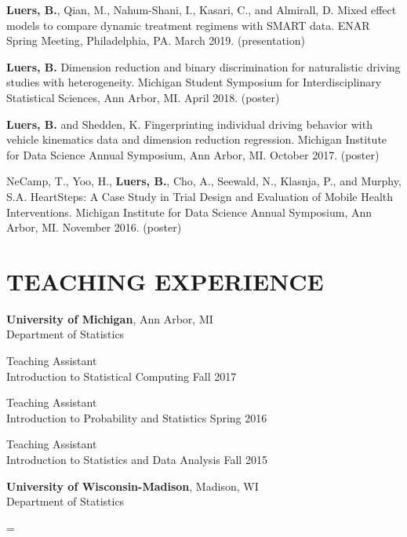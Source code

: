 \documentclass[letterpaper, 11pt]{article}
\newenvironment{absolutelynopagebreak}
  {\par\nobreak\vfil\penalty0\vfilneg
   \vtop\bgroup}
  {\par\xdef\tpd{\the\prevdepth}\egroup
   \prevdepth=\tpd}
\begin{document}
\textbf{Luers, B.}, Qian, M., Nahum-Shani, I., Kasari, C., and Almirall, D. 
Mixed effect models to compare dynamic treatment regimens with SMART data. 
ENAR Spring Meeting, Philadelphia, PA. March 2019. (presentation)

\textbf{Luers, B.} Dimension reduction and binary discrimination for naturalistic driving studies with heterogeneity. 
Michigan Student Symposium for Interdisciplinary Statistical Sciences, Ann Arbor, MI. April 2018. (poster)

\textbf{Luers, B.} and Shedden, K. Fingerprinting individual driving behavior with vehicle kinematics data and dimension reduction regression. Michigan Institute for Data Science Annual Symposium, Ann Arbor, MI. October 2017. (poster)

NeCamp, T., Yoo, H., \textbf{Luers, B.}, Cho, A., Seewald, N., Klasnja, P., and Murphy, S.A. HeartSteps: A Case Study in Trial Design and Evaluation of Mobile Health Interventions. Michigan Institute for Data Science Annual Symposium, Ann Arbor, MI. November 2016. (poster)


\section{TEACHING EXPERIENCE}
{\bf University of Michigan}, Ann Arbor, MI \\
Department of Statistics

\hspace{15pt}Teaching Assistant\\
\hspace{15pt}%
Introduction to Statistical Computing \hfill Fall 2017

\hspace{15pt}Teaching Assistant\\
\hspace{15pt}%
Introduction to Probability and Statistics \hfill Spring 2016

\hspace{15pt}Teaching Assistant\\
\hspace{15pt}%
Introduction to Statistics and Data Analysis \hfill Fall 2015

\vspace{6pt}
\begin{absolutelynopagebreak}
{\bf University of Wisconsin-Madison}, Madison, WI\\
Department of Statistics
\end{absolutelynopagebreak}
\end{document}
